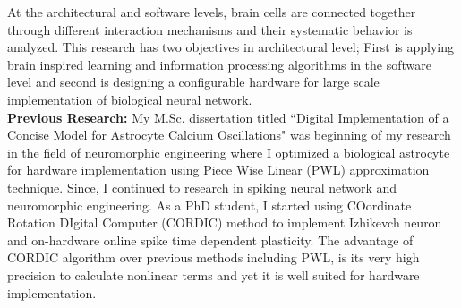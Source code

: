 \documentclass[12pt,oneside]{book}
\begin{document}
At the architectural and software levels, brain cells are connected together through different interaction mechanisms and their systematic behavior is analyzed. 
This research has two objectives in architectural level; First is applying brain inspired learning and information processing algorithms in the software level and second is  designing a configurable hardware for large scale implementation of biological neural network. \\
%
%
%
%
{\bf Previous Research: } 
My M.Sc. dissertation titled ``Digital Implementation of a Concise Model for Astrocyte Calcium Oscillations" was beginning of my research in the field of neuromorphic engineering where I optimized a biological astrocyte for hardware implementation using Piece Wise Linear (PWL) approximation technique. Since, I continued to research in spiking neural network and neuromorphic engineering. As a PhD student, I started using COordinate Rotation DIgital Computer (CORDIC) method to implement Izhikevch neuron and on-hardware online spike time dependent plasticity.  The advantage of CORDIC algorithm over previous methods including PWL, is its very high precision to calculate nonlinear terms and yet it is well suited for hardware implementation.  
\end{document}
